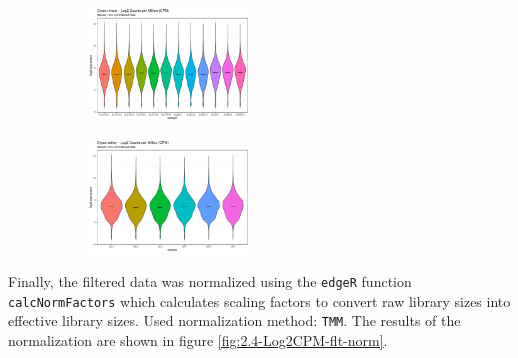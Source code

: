\begin{figure}[htbp]
    \caption[Log2(CPM) distribution of the filtered, non-normalized data]{Log2(CPM) distribution of the filtered (\(< 1\) CPM in at least half of the samples), non-normalized data}
    \label{fig:2.3-Log2CPM-flt-notnorm}
    \begin{subfigure}[t]{0.64\linewidth}
        \caption{}
        \label{fig:2.3-Log2CPM-flt-notnorm-Oryza_nivara}
        \includegraphics[width=\textwidth, height=3cm]{../../results/plots-and-tables/2.3-Log2CPM-flt-notnorm-Oryza_nivara}
    \end{subfigure}
    \begin{subfigure}[t]{0.32\linewidth}
        \caption{}
        \label{fig:2.3-Log2CPM-flt-notnorm-Oryza_sativa}
        \includegraphics[width=\textwidth, height=3cm]{../../results/plots-and-tables/2.3-Log2CPM-flt-notnorm-Oryza_sativa}
    \end{subfigure}
\end{figure}

Finally, the filtered data was normalized using the \verb|edgeR| function \verb|calcNormFactors| which calculates scaling factors to convert raw library sizes into effective library sizes. Used normalization method: \verb|TMM|. The results of the normalization are shown in figure \ref{fig:2.4-Log2CPM-flt-norm}.

